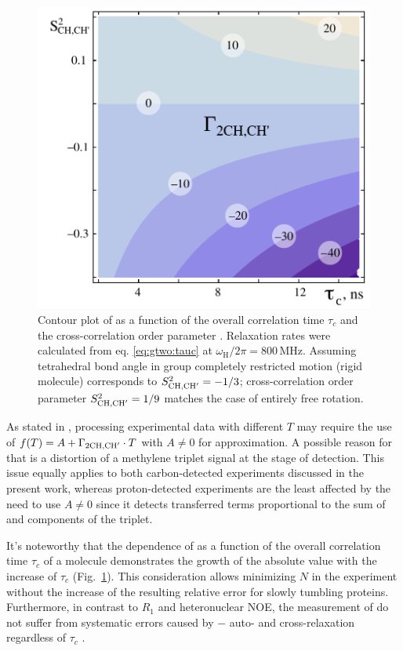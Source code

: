 \documentclass[twocolumn]{svjour3}           %
\begin{document}
\begin{figure}
    \includegraphics[width=\columnwidth]{Fig4}
    \caption{
    Contour plot of 
    \gtwoCH{} as a function of the overall correlation time $ \tau_c $ 
    and the cross-correlation order parameter \StwoCHp{}. Relaxation rates 
    were calculated from eq. \eqref{eq:gtwo:tauc} at $\omega_\text{H}/2 \pi = 800\,\text{MHz}$.
    \label{fig:g2contours}Assuming tetrahedral bond angle in \CHtwo{} group completely restricted motion (rigid molecule) corresponds to $S^2_{\text{CH,CH}'}{}=-1/3$; cross-correlation order parameter $S^2_{\text{CH,CH}'}{}=1/9$ matches the case of entirely free rotation.
    }
\end{figure}

As stated in \cite{carlomagno_errors_2000}, processing experimental data with different $T$ may require the use of $f(T) = A + \Gamma_{\text{2CH,CH}'}\cdot T$ with $A \ne 0$ for approximation. A possible reason for that is a distortion of a methylene \clab{} triplet signal 
at the stage of detection. This issue equally applies to both
carbon-detected experiments discussed in the present work, whereas proton-detected experiments are the 
least affected by the need to use $A \ne 0$ since it detects 
transferred terms proportional to the sum of \qinner{} and 
\qouter{} components of the triplet.

It's noteworthy that the dependence of \gtwoCH{} 
as a function of the overall correlation time $ \tau_c $ of a molecule  demonstrates the growth of the \gtwoCH{} absolute 
value with the increase of  $ \tau_c $
(Fig.~\ref{fig:g2contours}). This  consideration allows
minimizing $N$ in the experiment without the increase of the resulting \gtwoCH{} 
relative error for slowly tumbling proteins. Furthermore, in contrast to \clab{} $R_1$ and heteronuclear NOE, the measurement of \gtwoCH{} do not suffer 
from systematic errors caused by \clab{}$-$\clab{} auto- and cross-relaxation regardless of $ \tau_c $
\cite{yang_probing_2011,jin_cross-correlation_2003}.
\end{document}
